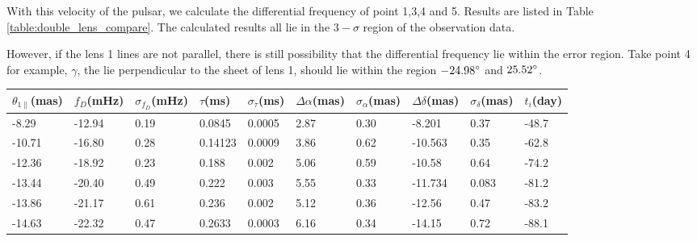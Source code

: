 \documentclass[useAMS,usenatbib]{mn2e}
\begin{document}
With this velocity of the pulsar, we calculate the differential frequency of point 1,3,4 and 5. Results are listed in Table \ref{table:double_lens_compare}. The calculated results all lie in the $3-\sigma$ region of the observation data. 

However, if the lens 1 lines are not parallel, there is still possibility that the differential frequency lie within the error region. Take point 4 for example, $\gamma$, the lie perpendicular to the sheet of lens 1, should lie within the region $-24.98 \degree$ and $\-25.52 \degree$.

\begin{table}
\centering
\begin{tabular}{llllllllll}
\hline
$\theta_{1\parallel}$(mas) &$f_D$(mHz) & $\sigma_{f_D}$(mHz) & $\tau$(ms) & $\sigma_{\tau}$(ms) & $\Delta\alpha$(mas) & $\sigma_{\alpha}$(mas) & $\Delta\delta$(mas) & $\sigma_{\delta}$(mas) & $t_i$(day)\\
\hline
 -8.29   & -12.94                            & 0.19      & 0.0845  & 0.0005          & 2.87    & 0.30                                     & -8.201     & 0.37      & -48.7                                \\

-10.71   &-16.80                             & 0.28      & 0.14123 & 0.0009         & 3.86    & 0.62                                     & -10.563    & 0.35      &-62.8                                \\

-12.36   &-18.92                            & 0.23      & 0.188   & 0.002           & 5.06    & 0.59                                      & -10.58    & 0.64      &-74.2                        \\

-13.44 & -20.40                             & 0.49      & 0.222   & 0.003           & 5.55    & 0.33                                      & -11.734    & 0.083      &-81.2                                \\

-13.86 &-21.17                            & 0.61      & 0.236   & 0.002           & 5.12    & 0.36                                   & -12.56    & 0.47      &-83.2                                \\

-14.63   &-22.32                            & 0.47      & 0.2633  & 0.0003          & 6.16    & 0.34                                     & -14.15    & 0.72       &-88.1                                \\


\end{tabular}
\end{table}
\end{document}
